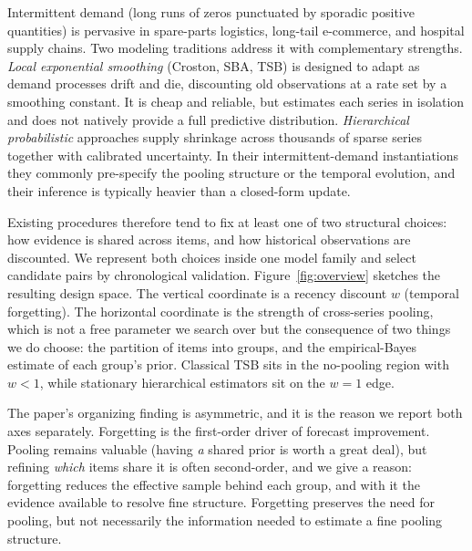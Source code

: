 \documentclass[twocolumn,10pt]{article}
\begin{document}
Intermittent demand (long runs of zeros punctuated by sporadic positive
quantities) is pervasive in spare-parts logistics, long-tail e-commerce,
and hospital supply chains. Two modeling traditions address it with
complementary strengths. \emph{Local exponential smoothing} (Croston,
SBA, TSB) \citep{croston1972,syntetos2005accuracy,teunter2011} is
designed to adapt as demand processes drift and die, discounting old
observations at a rate set by a smoothing constant. It is cheap and
reliable, but estimates each series in isolation and does not natively
provide a full predictive distribution. \emph{Hierarchical probabilistic}
approaches \citep{chapados2014,seeger2016,pitkin2024} supply shrinkage
across thousands of sparse series together with calibrated uncertainty.
In their intermittent-demand instantiations they commonly pre-specify the
pooling structure or the temporal evolution, and their inference is
typically heavier than a closed-form update.

Existing procedures therefore tend to fix at least one of two structural
choices: how evidence is shared across items, and how historical
observations are discounted. We represent both choices inside one model
family and select candidate pairs by chronological validation.
Figure~\ref{fig:overview} sketches the resulting design space. The
vertical coordinate is a recency discount $w$ (temporal forgetting). The
horizontal coordinate is the strength of cross-series pooling, which is
not a free parameter we search over but the consequence of two things
we do choose: the partition of items into groups, and the empirical-Bayes
estimate of each group's prior. Classical TSB sits in the no-pooling
region with $w<1$, while stationary hierarchical estimators sit on the $w{=}1$
edge.

The paper's organizing finding is asymmetric, and it is the reason we
report both axes separately. Forgetting is the first-order driver of
forecast improvement. Pooling remains valuable (having \emph{a} shared
prior is worth a great deal), but refining \emph{which} items share it is
often second-order, and we give a reason: forgetting reduces the
effective sample behind each group, and with it the evidence available to
resolve fine structure. Forgetting preserves the need for pooling, but
not necessarily the information needed to estimate a fine pooling
structure.
\end{document}
